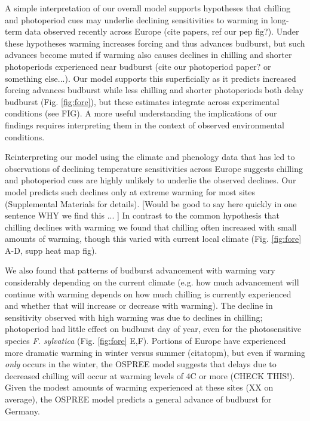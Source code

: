 \documentclass{article}
\begin{document}
\par A simple interpretation of our overall model supports hypotheses that chilling and photoperiod cues may underlie declining sensitivities to warming in long-term data observed recently across Europe (cite papers, ref our pep fig?). Under these hypotheses warming increases forcing and thus advances budburst, but such advances become muted if warming also causes declines in chilling and shorter photoperiods experienced near budburst (cite our photoperiod paper? or something else...). Our model supports this superficially as it predicts increased forcing advances budburst while less chilling and shorter photoperiods both delay budburst (Fig. \ref{fig:fore}), but these estimates integrate across experimental conditions (see FIG). A more useful understanding the implications of our findings requires interpreting them in the context of observed environmental conditions.

\par Reinterpreting our model using the climate and phenology data that has led to observations of declining temperature sensitivities across Europe suggests chilling and photoperiod cues are highly unlikely to underlie the observed declines. Our model predicts such declines only at extreme warming for most sites (Supplemental Materials for details). [Would be good to say here quickly in one sentence WHY we find this ... ] In contrast to the common hypothesis that chilling declines with warming we found that chilling often increased with small amounts of warming, though this varied with current local climate (Fig. \ref{fig:fore} A-D, supp heat map fig). 


We also found that patterns of budburst advancement with warming vary considerably depending on the current climate (e.g. how much advancement will continue with warming depends on how much chilling is currently experienced and whether that will increase or decrease with warming). The decline in sensitivity observed with high warming was due to declines in chilling; photoperiod had little effect on budburst day of year, even for the photosensitive species \emph{F. sylvatica} (Fig. \ref{fig:fore} E,F).  Portions of Europe have experienced more dramatic warming in winter versus summer (citatopm), but even if warming \emph{only} occurs in the winter, the OSPREE model suggests that delays due to decreased chilling will occur at warming levels of 4\degree C or more (CHECK THIS!). Given the modest amounts of warming experienced at these sites  (XX on average), the OSPREE model predicts a general advance of budburst for Germany. 
\end{document}
